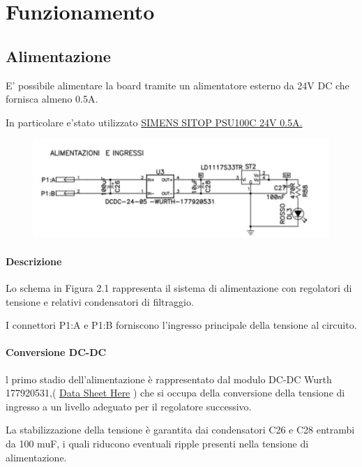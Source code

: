 \documentclass[12pt,a4paper]{report}
\begin{document}
\section{Funzionamento}
\subsection{Alimentazione}

E' possibile alimentare la board tramite un alimentatore esterno da 24V DC che fornisca almeno 0.5A.

In particolare e'stato utilizzato \href{https://www.e-repair.com/products-catalogue/sitop/6ep1331-5ba00}{SIMENS SITOP PSU100C 24V 0.5A.}

\begin{figure}[H]
    \centering
    \includegraphics[width=\linewidth]{../image/psu.png}
    \caption{ }
\end{figure}

\paragraph{Descrizione } 
Lo schema in Figura 2.1 
rappresenta il sistema di alimentazione con regolatori di tensione e relativi condensatori di filtraggio. 

I connettori P1:A e P1:B forniscono l'ingresso principale della tensione al circuito.

\paragraph{Conversione DC-DC } 
l primo stadio dell'alimentazione è rappresentato dal modulo DC-DC Wurth 177920531,( \href{https://www.we-online.com/components/products/datasheet/1769205341.pdf}{Data Sheet Here} )
che si occupa della conversione della tensione di ingresso a un livello adeguato per il regolatore successivo. 

La stabilizzazione della tensione è garantita dai condensatori C26 e C28 entrambi da 100 
muF, 
i quali riducono eventuali ripple presenti nella tensione di alimentazione.
\end{document}
